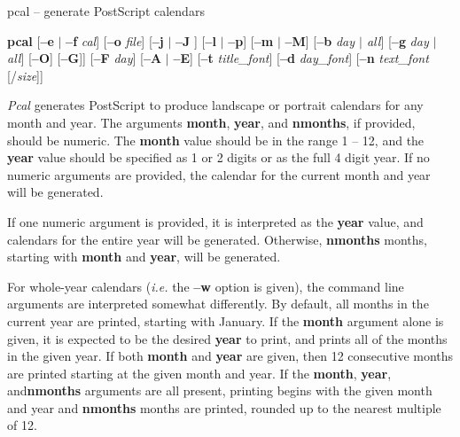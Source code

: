 

%
%
%

pcal -- generate PostScript calendars

{\bf pcal}
[{\bf --e} $|$ {\bf --f} {\it cal\/}] [{\bf --o} {\it file\/}]
[{\bf --j} $|$ {\bf --J} ] [{\bf --l} $|$ {\bf --p}] [{\bf --m} $|$ {\bf--M}]
[{\bf --b} {\it day $|$ all\/}] [{\bf --g} {\it day $|$ all\/}]
[{\bf --O}] [{\bf --G}]\hfil\break
[{\bf --s} [{\it date\_shade}] [{\it /fill\_shade}]]
[{\bf --F} {\it day\/}] [{\bf --A} $|$ {\bf --E}]
[{\bf --t} {\it title\_font\/}]
[{\bf --d} {\it day\_font\/}]
[{\bf --n} {\it text\_font\/} [/{\it size\/}]]\hfil{} \hfil\break
[{\bf --y} {\it yscale\/}] [{\bf --X} {\it xtrans\/}]
[{\bf --Y} {\it ytrans\/}] [{\bf --I}] [{\bf --B}]
[{\bf --S} $|$ {\bf --k} $|$ {\bf --K}] [{\bf --w}]
[{\bf --h} $|$ {\bf --u} $|$ {\bf --v}]\hfil\break
[month] [year] [nmonths]

{\it Pcal} generates PostScript to produce landscape or portrait
calendars for any month and year.  The arguments {\bf month}, {\bf year},
and {\bf nmonths}, if provided, should be numeric.  The {\bf month} value
should be in the range 1 -- 12, and the {\bf year} value should be
specified as 1 or 2 digits or as the full 4 digit year.  If no numeric
arguments are provided, the calendar for the current month and year will
be generated.

If one numeric argument is provided, it is interpreted as the {\bf year}
value, and calendars for the entire year will be generated.  Otherwise,
{\bf nmonths} months, starting with {\bf month} and {\bf year}, will be
generated.

For whole-year calendars ({\it i.e.} the {\bf --w} option is given), the
command line arguments are interpreted somewhat differently.  By default,
all months in the current year are printed, starting with January.  If
the {\bf month} argument alone is given, it is expected to be the desired
{\bf year} to print, and prints all of the months in the given year.  If
both {\bf month} and {\bf year} are given, then 12 consecutive months are
printed starting at the given month and year.  If the {\bf month}, {\bf
year}, and{\bf nmonths} arguments are all present, printing begins with
the given month and year and {\bf nmonths} months are printed, rounded up
to the nearest multiple of 12.

